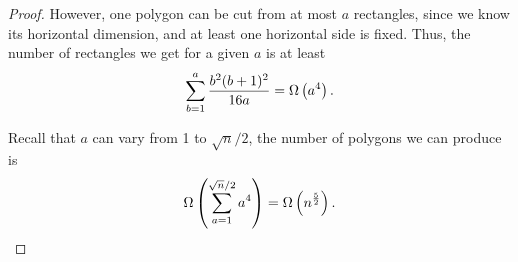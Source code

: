 \documentclass[a4paper,11pt]{article}
\begin{document}
\begin{proof}
However, one polygon can be cut from at most $a$ rectangles, since we know its horizontal dimension, and at least one horizontal side is fixed. Thus, the number of rectangles we get for a given $a$ is at least
\[ \sum\limits_{b=1}^a \frac{b^2 (b+1)^2}{16a} = \Omega\left( a^4 \right). \]

Recall that $a$ can vary from 1 to $\sqrt n / 2$, the number of polygons we can produce is
\[ \Omega \left( \sum\limits_{a=1}^{\sqrt n / 2} a^4 \right) = \Omega \left( n^\frac{5}{2} \right). \]

\end{proof}

% 
\end{document}
